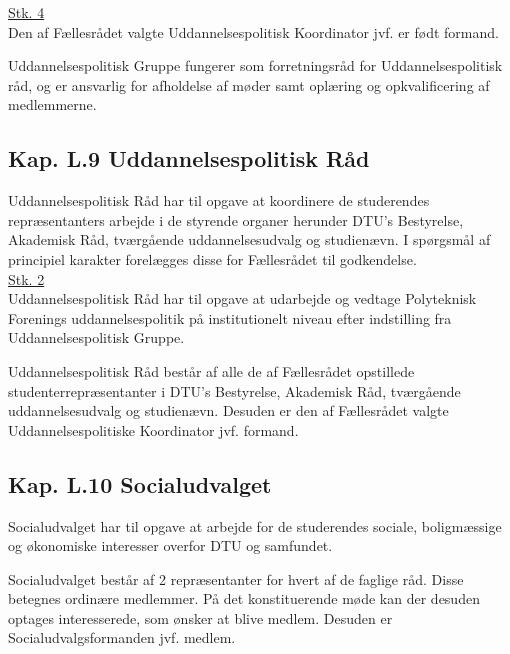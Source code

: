 \begin{list}
\underline{Stk. 4}\\ 
Den af Fællesrådet valgte Uddannelsespolitisk Koordinator jvf.  er født formand.\\

\item Uddannelsespolitisk Gruppe fungerer som forretningsråd for Uddannelsespolitisk råd, og er ansvarlig for afholdelse af møder samt oplæring og opkvalificering af medlemmerne.\\

\subsection*{Kap. L.9 Uddannelsespolitisk Råd}
\label{L:kap:upr}
\item Uddannelsespolitisk Råd har til opgave at koordinere de studerendes repræsentanters arbejde i de styrende organer herunder DTU’s Bestyrelse, Akademisk Råd, tværgående uddannelsesudvalg og studienævn. I spørgsmål af principiel karakter forelægges disse for Fællesrådet til godkendelse.\\

\underline{Stk. 2}\\
Uddannelsespolitisk Råd har til opgave at udarbejde og vedtage Polyteknisk Forenings uddannelsespolitik på institutionelt niveau efter indstilling fra Uddannelsespolitisk Gruppe.\\

\item Uddannelsespolitisk Råd består af alle de af Fællesrådet opstillede studenterrepræsentanter i DTU’s Bestyrelse, Akademisk Råd, tværgående uddannelsesudvalg og studienævn. Desuden er den af Fællesrådet valgte Uddannelsespolitiske Koordinator jvf.  formand.\\

\subsection*{Kap. L.10 Socialudvalget}
\label{L:kap:socialudvalg}
\item Socialudvalget har til opgave at arbejde for de studerendes sociale, boligmæssige og økonomiske interesser overfor DTU og samfundet.\\

\item Socialudvalget består af 2 repræsentanter for hvert af de faglige råd. Disse betegnes ordinære medlemmer. På det konstituerende møde kan der desuden optages interesserede, som ønsker at blive medlem. Desuden er Socialudvalgsformanden jvf.  medlem.\\


\end{list}
